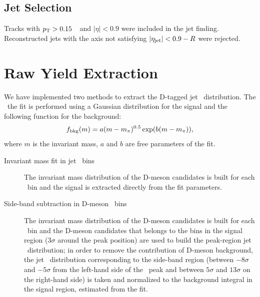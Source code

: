 \subsection{Jet Selection}
Tracks with $p_{\rm T}>0.15$~\GeVc\ and $|\eta|<0.9$ were included in the jet finding. 
Reconstructed jets with the axis not satisfying $|\eta_{\mathrm{jet}}|<0.9-R$ were rejected.


\section{Raw Yield Extraction}
\label{sect:raw_yield}

We have implemented two methods to extract the D-tagged jet \pt\ distribution. 
The \Dstar\ the fit is performed using a Gaussian distribution for the signal and the following function for the background:
\begin{equation}
\label{e_bkgDStar}
f_{\rm bkg} (m) = a (m-m_{\pi})^{0.5}\exp(b (m-m_{\pi})),
\end{equation}
where $m$ is the invariant mass, $a$ and $b$ are free parameters of the fit.
\begin{description}
\item[Invariant mass fit in jet \pt\ bins] The invariant mass distribution of the D-meson candidates is built for each \ptchjet\ bin and the signal is extracted directly from the fit parameters.
\item[Side-band subtraction in D-meson \pt\ bins] The invariant mass distribution of the D-meson candidates is built for each \ptd\ bin and the D-meson candidates that belongs to the bins in the signal region ($3\sigma$ around the peak position) are used to build the peak-region jet \pt\ distribution;
in order to remove the contribution of D-meson background, the jet \pt\ distribution corresponding 
to the side-band region (between $-8\sigma$ and $-5\sigma$ from the left-hand side of the \Dstar\ peak and between $5\sigma$ and $13\sigma$ on the right-hand side) is taken and normalized to the background integral in the signal region, estimated from the fit.
\end{description}

